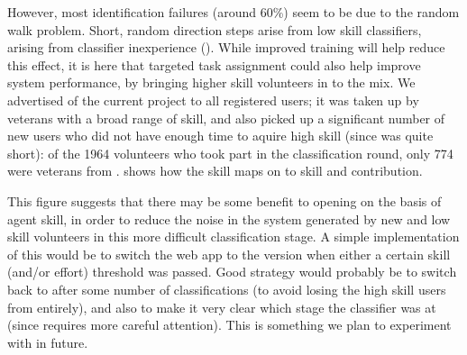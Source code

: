 \documentclass[useAMS,usenatbib,a4paper]{mn2e}
\begin{document}
However, most identification failures (around 60\%) seem to be due to the
random walk problem. Short, random direction steps arise from low skill
classifiers, arising from classifier inexperience ().
While improved training will help reduce this effect, it is here
that targeted task assignment could also help improve system performance, by
bringing higher skill volunteers in to the mix. We
advertised \StageTwo of the current project to all registered users; it was
taken up by \StageOne veterans with a broad range of skill, and also picked up a
significant number of new users who did not have enough time to aquire high
skill (since \StageTwo was quite short): of the 1964 volunteers who took part in
the \StageTwo classification round, only 774 were veterans from \StageOne.
 shows how the \StageOne skill maps
on to \StageTwo skill and contribution.

This figure suggests that there may be some benefit to opening \StageTwo on the
basis of \StageOne agent skill, in order to reduce the noise in the system
generated by new and low skill volunteers in this more difficult
classification stage.  A simple implementation of this would be to switch the
web app to the \StageTwo version when either a certain \StageOne skill (and/or
effort) threshold was passed. Good strategy would probably be to switch back
to \StageOne after some number of \StageTwo classifications (to avoid losing the
high skill users from \StageOne entirely), and also to make it very clear which
stage the classifier was at (since \StageTwo requires more careful attention).
This is something we plan to experiment with in future.
\end{document}
